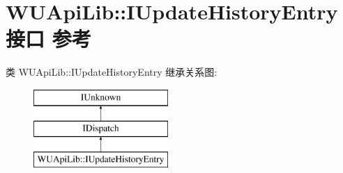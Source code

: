 \hypertarget{interface_w_u_api_lib_1_1_i_update_history_entry}{}\section{W\+U\+Api\+Lib\+:\+:I\+Update\+History\+Entry接口 参考}
\label{interface_w_u_api_lib_1_1_i_update_history_entry}
类 W\+U\+Api\+Lib\+:\+:I\+Update\+History\+Entry 继承关系图\+:\begin{figure}[H]
\begin{center}
\leavevmode
\includegraphics[height=3.000000cm]{interface_w_u_api_lib_1_1_i_update_history_entry}
\end{center}
\end{figure}
